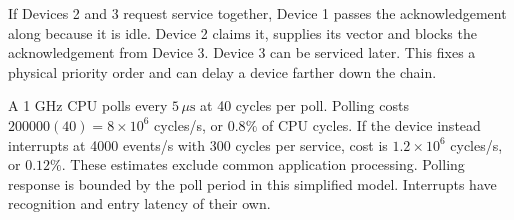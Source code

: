 \documentclass[12pt,a4paper]{article}
\begin{document}
If Devices 2 and 3 request service together, Device 1 passes the acknowledgement along because it is idle. Device 2 claims it, supplies its vector and blocks the acknowledgement from Device 3. Device 3 can be serviced later. This fixes a physical priority order and can delay a device farther down the chain.

\begin{tcolorbox}[examplebox,title={Compare polling overhead with interrupt overhead}]
A 1 GHz CPU polls every $5\,\mu\mathrm s$ at 40 cycles per poll. Polling costs $200000(40)=8\times10^6$ cycles/s, or $0.8\%$ of CPU cycles. If the device instead interrupts at 4000 events/s with 300 cycles per service, cost is $1.2\times10^6$ cycles/s, or $0.12\%$. These estimates exclude common application processing. Polling response is bounded by the poll period in this simplified model. Interrupts have recognition and entry latency of their own.
\end{tcolorbox}
\end{document}
